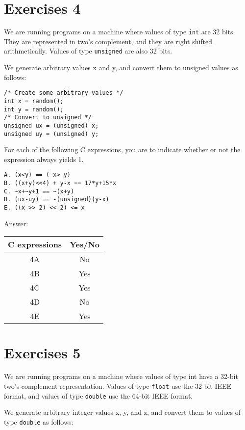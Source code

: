 \documentclass[a4paper]{article}
\begin{document}
\section{Exercises 4}
We are running programs on a machine where values of type \texttt{int} are 32 bits. They are represented in two's complement, and they are right shifted arithmetically. Values of type \texttt{unsigned} are also 32 bits. 

We generate arbitrary values x and y, and convert them to unsigned values as follows:

\begin{verbatim}
/* Create some arbitrary values */
int x = random();
int y = random();
/* Convert to unsigned */
unsigned ux = (unsigned) x;
unsigned uy = (unsigned) y;
\end{verbatim}

For each of the following C expressions, you are to indicate whether or not the expression always yields 1.

\begin{verbatim}
A. (x<y) == (-x>-y)
B. ((x+y)<<4) + y-x == 17*y+15*x
C. ~x+~y+1 == ~(x+y)
D. (ux-uy) == -(unsigned)(y-x)
E. ((x >> 2) << 2) <= x
\end{verbatim}

Answer: %

\begin{table}[ht]
\begin{tabular}{|c|c|}
\hline
C expressions&Yes/No\\
\hline
4A & No \\
\hline
4B & Yes \\
\hline
4C & Yes \\
\hline
4D & No \\
\hline
4E & Yes \\
\hline
\end{tabular}
\end{table}

\section{Exercises 5}
We are running programs on a machine where values of type int have a 32-bit two's-complement representation. Values of type \texttt{float} use the 32-bit IEEE format, and values of type \texttt{double} use the 64-bit IEEE format.

We generate arbitrary integer values x, y, and z, and convert them to values of type \texttt{double} as follows:
\end{document}
